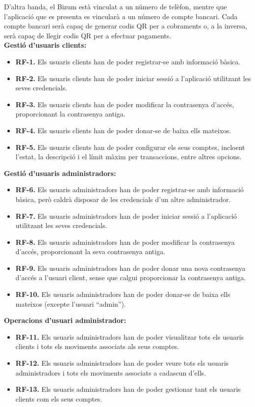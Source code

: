 \documentclass[a4paper,12pt,twoside]{ThesisStyle}
\begin{document}
D'altra banda, el Bizum està vinculat a un número de telèfon, mentre que l'aplicació que es presenta es vincularà a un número de compte bancari. Cada compte bancari serà capaç de generar codis QR per a cobraments o, a la inversa, serà capaç de llegir codis QR per a efectuar pagaments.\\



\textbf{Gestió d'usuaris clients:}
\begin{itemize}
    \item \textbf{RF-1.} Els usuaris clients han de poder registrar-se amb informació bàsica.
    \item \textbf{RF-2.} Els usuaris clients han de poder iniciar sessió a l'aplicació utilitzant les seves credencials.
    \item \textbf{RF-3.} Els usuaris clients han de poder modificar la contrasenya d'accés, proporcionant la contrasenya antiga.
    \item \textbf{RF-4.} Els usuaris clients han de poder donar-se de baixa ells mateixos.
    \item \textbf{RF-5.} Els usuaris clients han de poder configurar els seus comptes, incloent l'estat, la descripció i el límit màxim per transaccions, entre altres opcions.
\end{itemize}


\textbf{Gestió d'usuaris administradors:}
\begin{itemize}
    \item \textbf{RF-6.} Els usuaris administradors han de poder registrar-se amb informació bàsica, però caldrà disposar de les credencials d'un altre administrador.
    \item \textbf{RF-7.} Els usuaris administradors han de poder iniciar sessió a l'aplicació utilitzant les seves credencials.
    \item \textbf{RF-8.} Els usuaris administradors han de poder modificar la contrasenya d'accés, proporcionant la seva contrasenya antiga.
    \item \textbf{RF-9.} Els usuaris administradors han de poder donar una nova contrasenya d'accés a l'usuari client, sense que calgui proporcionar la contrasenya antiga.
    \item \textbf{RF-10.} Els usuaris administradors han de poder donar-se de baixa ells mateixos (excepte l'usuari ``admin'').
\end{itemize}


\textbf{Operacions d'usuari administrador:}
\begin{itemize}
    \item \textbf{RF-11.} Els usuaris administradors han de poder visualitzar tots els usuaris clients i tots els moviments associats als seus comptes.
    \item \textbf{RF-12.} Els usuaris administradors han de poder veure tots els usuaris administradors i tots els moviments associats a cadascun d'ells.
    \item \textbf{RF-13.} Els usuaris administradors han de poder gestionar tant els usuaris clients com els seus comptes.
\end{itemize}
\end{document}
